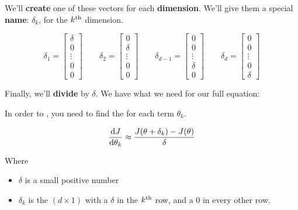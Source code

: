         We'll \textbf{create} one of these vectors for each \textbf{dimension}. We'll give them a special \textbf{name}: $\delta_k$, for the $k^{ \text{th} }$ dimension.
        
        \begin{equation}
            \delta_1 
            = 
            \begin{bmatrix}
                \delta \\ 0 \\ \vdots\\ 0 \\ 0
            \end{bmatrix}
            \qquad
            \delta_2 
            = 
            \begin{bmatrix}
                0 \\ \delta \\ \vdots\\ 0 \\ 0
            \end{bmatrix}
            \qquad
            \delta_{d-1} 
            = 
            \begin{bmatrix}
                0 \\ 0 \\ \vdots\\ \delta \\ 0
            \end{bmatrix}
            \qquad
            \delta_{d} 
            = 
            \begin{bmatrix}
                0 \\ 0 \\ \vdots\\ 0 \\ \delta
            \end{bmatrix}
        \end{equation}
        
        Finally, we'll \textbf{divide} by $\delta$. We have what we need for our full equation:\\
        
        \begin{kequation}
            In order to , you need to find the  for each term $\theta_k$.
            
            \begin{equation*}
                \frac{\dd J}{\dd \theta_k} \approx
                \frac{J(\theta+\delta_k)-J(\theta)}{\delta}
            \end{equation*}
            
            Where 
            
            \begin{itemize}
                \item $\delta$ is a small positive number
                \item $\delta_k$ is the $(d \times 1)$  with a $\delta$ in the $k^{ \text{th} }$ row, and a 0 in every other row.
            \end{itemize} 
        \end{kequation}

